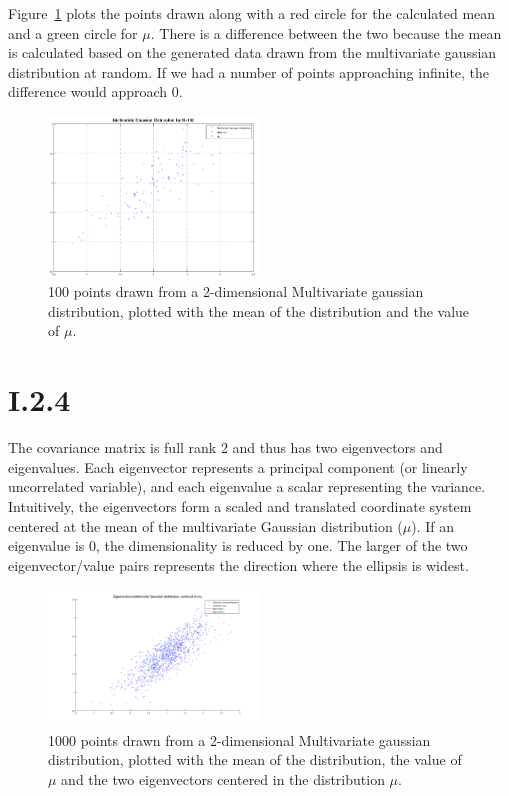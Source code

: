 Figure~\ref{fig:I.2.3} plots the points drawn along with a red circle for the calculated mean and a green circle
for $\mu$. There is a difference between the two because the mean is calculated based on the generated data drawn
from the multivariate gaussian distribution at random. If we had a number of points approaching infinite, the difference
would approach 0.

\begin{figure}[h!]
	\includegraphics[width=0.5\textwidth]{img/multigaussmeanxy}
	\caption{100 points drawn from a 2-dimensional Multivariate gaussian distribution, plotted with
	the mean of the distribution and the value of $\mu$. \label{fig:I.2.3}}
\end{figure}

\FloatBarrier
\section*{I.2.4}
The covariance matrix is full rank 2 and thus has two eigenvectors and eigenvalues. Each eigenvector represents
a principal component (or linearly uncorrelated variable), and each eigenvalue a scalar representing the variance.
Intuitively, the eigenvectors form a scaled and translated coordinate system centered at the mean of the multivariate
Gaussian distribution ($\mu$). If an eigenvalue is 0, the dimensionality is reduced by one. The larger of the two
eigenvector/value pairs represents the direction where the ellipsis is widest.

\begin{figure}[h!]
	\includegraphics[width=0.5\textwidth]{img/multigausseigen}
	\caption{1000 points drawn from a 2-dimensional Multivariate gaussian distribution, plotted with the
	mean of the distribution, the value of $\mu$ and the two eigenvectors centered in the distribution $\mu$. \label{fig:I.2.4.1}}
\end{figure}


